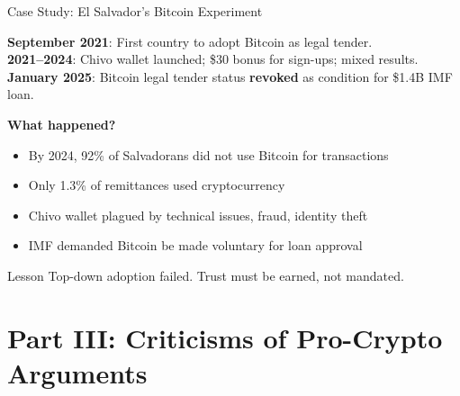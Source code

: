 ﻿\documentclass[aspectratio=169,11pt]{beamer}
\begin{document}
\begin{frame}{Case Study: El Salvador's Bitcoin Experiment}
\begin{casestudybox}[Timeline]
\textbf{September 2021}: First country to adopt Bitcoin as legal tender.\\
\textbf{2021--2024}: Chivo wallet launched; \$30 bonus for sign-ups; mixed results.\\
\textbf{January 2025}: Bitcoin legal tender status \textbf{revoked} as condition for \$1.4B IMF loan.
\end{casestudybox}

\vspace{0.3em}
\textbf{What happened?}
\begin{itemize}
    \item By 2024, 92\% of Salvadorans did not use Bitcoin for transactions
    \item Only 1.3\% of remittances used cryptocurrency
    \item Chivo wallet plagued by technical issues, fraud, identity theft
    \item IMF demanded Bitcoin be made voluntary for loan approval
\end{itemize}

\begin{alertblock}{Lesson}
Top-down adoption failed. Trust must be earned, not mandated.
\end{alertblock}
\end{frame}

\section{Part III: Criticisms of Pro-Crypto Arguments}
\end{document}
